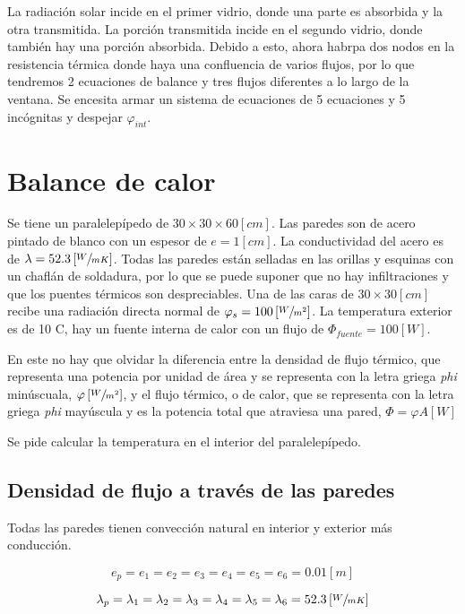 \documentclass[11pt]{article}
\begin{document}
La radiación solar incide en el primer vidrio, donde una parte es absorbida y la otra transmitida. La porción transmitida incide en el segundo vidrio, donde también hay una porción absorbida. Debido a esto, ahora habrpa dos nodos en la resistencia térmica donde haya una confluencia de varios flujos, por lo que tendremos 2 ecuaciones de balance y tres flujos diferentes a lo largo de la ventana. Se encesita armar un sistema de ecuaciones de 5 ecuaciones y 5 incógnitas y despejar $ \varphi _{ int } $.


\section{Balance de calor}

Se tiene un paralelepípedo de $ 30 \times 30 \times 60 \left[ cm \right] $. Las paredes son de acero pintado de blanco con un espesor de $ e = 1 \left[ cm \right] $. La conductividad del acero es de $ \lambda = 52.3 \left[ \sfrac{ W }{ m K } \right] $. Todas las paredes están selladas en las orillas y esquinas con un chaflán de soldadura, por lo que se puede suponer que no hay infiltraciones y que los puentes térmicos son despreciables. Una de las caras de $ 30 \times 30 \left[ cm \right] $ recibe una radiación directa normal de $ \varphi _s = 100 \left[ \sfrac{ W }{ m ^2 } \right] $. La temperatura exterior es de 10 \degree C, hay un fuente interna de calor con un flujo de $ \Phi _{ fuente } = 100 \left[ W \right] $.

En este no hay que olvidar la diferencia entre la densidad de flujo térmico, que representa una potencia por unidad de área y se representa con la letra griega \emph{phi} minúscuala, $ \varphi \left[ \sfrac{ W }{ m ^2 } \right] $, y el flujo térmico, o de calor, que se representa con la letra griega \emph{phi} mayúscula y es la potencia total que atraviesa una pared, $ \Phi = \varphi A \left[ W \right] $

Se pide calcular la temperatura en el interior del paralelepípedo.

\subsection{Densidad de flujo a través de las paredes}

Todas las paredes tienen convección natural en interior y exterior más conducción.

\[ e_p = e_1 = e_2 = e_3 = e_4 = e_5 = e_6 = 0.01 \left[ m \right] \]

\[ \lambda _p = \lambda _1 = \lambda _2 = \lambda _3 = \lambda _4 = \lambda _5 = \lambda _6 = 52.3 \left[ \sfrac{ W }{ m K } \right] \]
\end{document}
